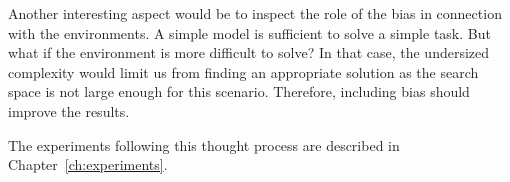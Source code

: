 Another interesting aspect would be to inspect the role of the bias in connection with the environments. A simple model is sufficient to solve a simple task. But what if the environment is more difficult to solve? In that case, the undersized complexity would limit us from finding an appropriate solution as the search space is not large enough for this scenario. Therefore, including bias should improve the results.

The experiments following this thought process are described in Chapter~\ref{ch:experiments}.


